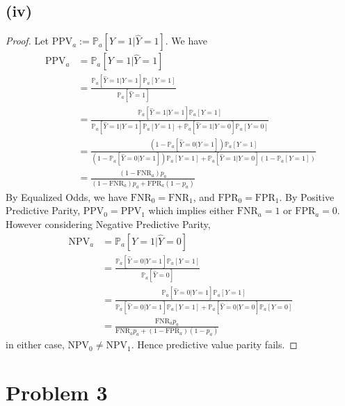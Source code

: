 \documentclass[twoside,11pt]{homework}
\begin{document}
\subsection*{(iv)}
	\begin{proof}
		Let $\text{PPV}_a := \mathbb{P}_a[Y=1 | \hat{Y}=1]$. We have
		\begin{align*}
			\text{PPV}_a & = \mathbb{P}_a[Y=1 | \hat{Y}=1] \\
			&= \frac{\mathbb{P}_a[\hat{Y}=1|Y=1] \mathbb{P}_a[Y=1] }
			{\mathbb{P}_a[\hat{Y}=1] } \tag{Bayes Rule}\\
			&= \frac{\mathbb{P}_a[\hat{Y}=1|Y=1] \mathbb{P}_a[Y=1] }
			{\mathbb{P}_a[\hat{Y}=1|Y=1] \mathbb{P}_a[Y=1]+
			\mathbb{P}_a[\hat{Y}=1|Y=0] \mathbb{P}_a[Y=0] }\\
			&= \frac{ (1-\mathbb{P}_a[\hat{Y}=0|Y=1]) \mathbb{P}_a[Y=1] }
			{ (1-\mathbb{P}_a[\hat{Y}=0|Y=1])  \mathbb{P}_a[Y=1]+
			\mathbb{P}_a[\hat{Y}=1|Y=0] (1-\mathbb{P}_a[Y=1]) }\\
			&= \frac{(1-\text{FNR}_a) p_a}{(1-\text{FNR}_a)  p_a+\text{FPR}_a(1-p_a)}
		\end{align*}
		By Equalized Odds, we have $\text{FNR}_0=\text{FNR}_1$, and $\text{FPR}_0=\text{FPR}_1$.
		By Positive Predictive Parity, $\text{PPV}_0=\text{PPV}_1$ which implies either $\text{FNR}_a=1$ 
		or $\text{FPR}_a=0$. However considering Negative Predictive Parity,
		\begin{align*}
			\text{NPV}_a &=  \mathbb{P}_a[Y=1 | \hat{Y}=0] \\
			&= \frac{\mathbb{P}_a[\hat{Y}=0|Y=1] \mathbb{P}_a[Y=1] }
			{\mathbb{P}_a[\hat{Y}=0] } \tag{Bayes Rule}\\
			&= \frac{\mathbb{P}_a[\hat{Y}=0|Y=1] \mathbb{P}_a[Y=1] }
			{\mathbb{P}_a[\hat{Y}=0|Y=1] \mathbb{P}_a[Y=1]+
			\mathbb{P}_a[\hat{Y}=0|Y=0] \mathbb{P}_a[Y=0] }\\
			&= \frac{\text{FNR}_a p_a}{\text{FNR}_a p_a+(1-\text{FPR}_a)(1-p_a)}
		\end{align*}
		in either case, $\text{NPV}_0\neq \text{NPV}_1$. Hence predictive value parity fails.
	\end{proof}

\section*{Problem 3} 
\end{document}
